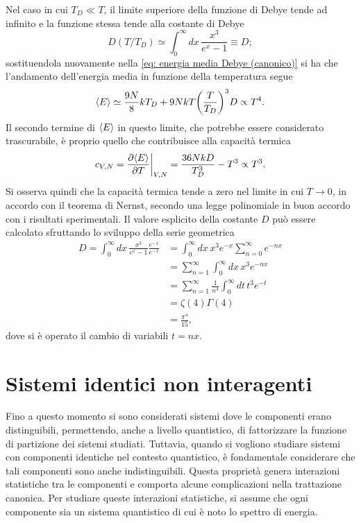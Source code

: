 \begin{caso}
    Nel caso in cui $T_D \ll T$, il limite superiore della funzione di Debye tende ad infinito e la funzione stessa tende alla costante di Debye
    \begin{equation}
        D(T/T_D) \simeq \int_0^\infty dx\,\frac{x^3}{e^x - 1} \equiv D;
    \end{equation}
    sostituendola nuovamente nella \eqref{eq: energia media Debye (canonico)} si ha che l'andamento dell'energia media in funzione della temperatura segue
    \begin{equation}
        \langle E \rangle \simeq \frac{9N}{8}kT_D + 9NkT\bigg(\frac{T}{T_D}\bigg)^3D \propto T^4.
    \end{equation}
    Il secondo termine di $\langle E \rangle$ in questo limite, che potrebbe essere considerato trascurabile, è proprio quello che contribuisce alla capacità termica
    \begin{equation}
        c_{V,N} = \frac{\partial\langle E \rangle}{\partial T}\bigg|_{V,N} = \frac{36NkD}{T_D^3} - T^3 \propto T^3.
    \end{equation}
    Si osserva quindi che la capacità termica tende a zero nel limite in cui $T \to 0$, in accordo con il teorema di Nernst, secondo una legge polinomiale in buon accordo con i risultati sperimentali. Il valore esplicito della costante $D$ può essere calcolato sfruttando lo sviluppo della serie geometrica
    \begin{equation}
    \label{eq: costante di Debye}
        \begin{split}
            D = \int_0^\infty dx\,\frac{x^3}{e^x - 1}\frac{e^{-x}}{e^{-x}} &= \int _0^\infty dx\,x^3e^{-x}\sum_{n=0}^\infty e^{-nx} \\
            &= \sum_{n=1}^\infty\int_0^\infty dx\,x^3e^{-nx} \\
            &= \sum_{n=1}^\infty\frac{1}{n^4}\int_0^\infty dt\,t^3e^{-t} \\
            &= \zeta(4)\Gamma(4) \\
            &=\frac{\pi^4}{15},
        \end{split}
    \end{equation}
    dove si è operato il cambio di variabili $t = nx$.
\end{caso}

\section{Sistemi identici non interagenti}
Fino a questo momento si sono considerati sistemi dove le componenti erano distinguibili, permettendo, anche a livello quantistico, di fattorizzare la funzione di partizione dei sistemi studiati. Tuttavia, quando si vogliono studiare sistemi con componenti identiche nel contesto quantistico, è fondamentale considerare che tali componenti sono anche indistinguibili. Questa proprietà genera interazioni statistiche tra le componenti e comporta alcune complicazioni nella trattazione canonica. Per studiare queste interazioni statistiche, si assume che ogni componente sia un sistema quantistico di cui è noto lo spettro di energia. 

